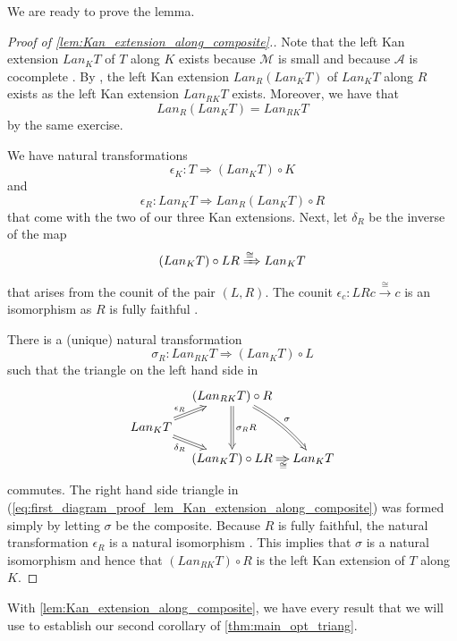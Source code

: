We are ready to prove the lemma.
\begin{proof}[Proof of \cref{lem:Kan_extension_along_composite}.]
Note that the left Kan extension $Lan_KT$ of $T$ along $K$ exists because $\mathscr{M}$ is small and because $\mathscr{A}$ is cocomplete \cite[§X.3~Cor.~2]{ML98}. By \cite[Ex.~X.4.3]{ML98}, the left Kan extension $Lan_R(Lan_KT)$ of $Lan_KT$ along $R$ exists as the left Kan extension $Lan_{RK}T$ exists. Moreover, we have that
\[Lan_R(Lan_KT)=Lan_{RK}T\]
by the same exercise.

We have natural transformations
\[\epsilon _K:T\Rightarrow (Lan_KT)\circ K\]
and
\[\epsilon _R:Lan_KT\Rightarrow Lan_R(Lan_KT)\circ R\]
that come with the two of our three Kan extensions. Next, let $\delta _R$ be the inverse of the map
\[(Lan_KT)\circ LR\xRightarrow{\cong } Lan_KT\]
that arises from the counit of the pair $(L,R)$. The counit $\epsilon _c:LRc\xrightarrow{\cong } c$ is an isomorphism as $R$ is fully faithful \cite[§IV.3~Thm.~1]{ML98}.

There is a (unique) natural transformation
\[\sigma _R:Lan_{RK}T\Rightarrow (Lan_KT)\circ L\]
such that the triangle on the left hand side in
\begin{equation}
\label{eq:first_diagram_proof_lem_Kan_extension_along_composite}
\begin{gathered}
\xymatrix@=1em{
& (Lan_{RK}T)\circ R \ar@/^/@{=>}[ddr]^(.55)\sigma \ar@{=>}[dd]^{\sigma _RR} \\
Lan_KT \ar@{=>}[ur]^(.4){\epsilon _R} \ar@{=>}[dr]_(.4){\delta _R} \\
& (Lan_KT)\circ LR \ar@{=>}[r]_(.63)\cong & Lan_KT
}
\end{gathered}
\end{equation}
commutes. The right hand side triangle in (\ref{eq:first_diagram_proof_lem_Kan_extension_along_composite}) was formed simply by letting $\sigma$ be the composite. Because $R$ is fully faithful, the natural transformation $\epsilon _R$ is a natural isomorphism \cite[§X.3~Cor.~3]{ML98}. This implies that $\sigma$ is a natural isomorphism and hence that $(Lan_{RK}T)\circ R$ is the left Kan extension of $T$ along $K$.
\end{proof}
\noindent With \cref{lem:Kan_extension_along_composite}, we have every result that we will use to establish our second corollary of \cref{thm:main_opt_triang}.

